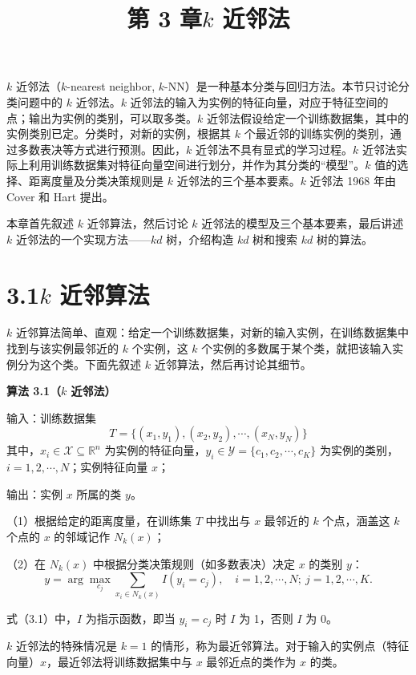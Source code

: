 \documentclass[UTF8, 12pt, fontset=fandol, oneside]{ctexart}
\title{第 3 章\quad $k$ 近邻法}
\author{}
\date{}
\begin{document}
\maketitle

$k$ 近邻法（$k$-nearest neighbor, $k$-NN）是一种基本分类与回归方法。本节只讨论分类问题中的 $k$ 近邻法。$k$ 近邻法的输入为实例的特征向量，对应于特征空间的点；输出为实例的类别，可以取多类。$k$ 近邻法假设给定一个训练数据集，其中的实例类别已定。分类时，对新的实例，根据其 $k$ 个最近邻的训练实例的类别，通过多数表决等方式进行预测。因此，$k$ 近邻法不具有显式的学习过程。$k$ 近邻法实际上利用训练数据集对特征向量空间进行划分，并作为其分类的“模型”。$k$ 值的选择、距离度量及分类决策规则是 $k$ 近邻法的三个基本要素。$k$ 近邻法 1968 年由 Cover 和 Hart 提出。

本章首先叙述 $k$ 近邻算法，然后讨论 $k$ 近邻法的模型及三个基本要素，最后讲述 $k$ 近邻法的一个实现方法——$kd$ 树，介绍构造 $kd$ 树和搜索 $kd$ 树的算法。

\section*{3.1\quad $k$ 近邻算法}

$k$ 近邻算法简单、直观：给定一个训练数据集，对新的输入实例，在训练数据集中找到与该实例最邻近的 $k$ 个实例，这 $k$ 个实例的多数属于某个类，就把该输入实例分为这个类。下面先叙述 $k$ 近邻算法，然后再讨论其细节。

\noindent\textbf{算法 3.1（$k$ 近邻法）}

\noindent 输入：训练数据集
\[
T=\{(x_1,y_1),(x_2,y_2),\cdots,(x_N,y_N)\}
\]
其中，$x_i\in\mathcal{X}\subseteq \mathbb{R}^n$ 为实例的特征向量，$y_i\in\mathcal{Y}=\{c_1,c_2,\cdots,c_K\}$ 为实例的类别，$i=1,2,\cdots,N$；实例特征向量 $x$；

\noindent 输出：实例 $x$ 所属的类 $y$。

（1）根据给定的距离度量，在训练集 $T$ 中找出与 $x$ 最邻近的 $k$ 个点，涵盖这 $k$ 个点的 $x$ 的邻域记作 $N_k(x)$；

（2）在 $N_k(x)$ 中根据分类决策规则（如多数表决）决定 $x$ 的类别 $y$：
\begin{equation}
y=\arg\max_{c_j}\sum_{x_i\in N_k(x)} I(y_i=c_j),\quad i=1,2,\cdots,N;\ j=1,2,\cdots,K.
\tag{3.1}
\end{equation}

式（3.1）中，$I$ 为指示函数，即当 $y_i=c_j$ 时 $I$ 为 1，否则 $I$ 为 0。

$k$ 近邻法的特殊情况是 $k=1$ 的情形，称为最近邻算法。对于输入的实例点（特征向量）$x$，最近邻法将训练数据集中与 $x$ 最邻近点的类作为 $x$ 的类。
\end{document}
